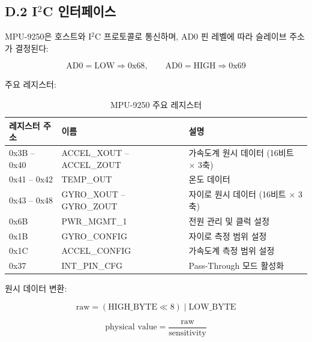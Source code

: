 \subsection*{D.2 I$^2$C 인터페이스}
 
MPU-9250은 호스트와 I$^2$C 프로토콜로 통신하며,
AD0 핀 레벨에 따라 슬레이브 주소가 결정된다:
 
\begin{equation}
    \text{AD0} = \text{LOW} \Rightarrow 0\text{x}68, \qquad
    \text{AD0} = \text{HIGH} \Rightarrow 0\text{x}69
    \tag{D.1}
\end{equation}
 
주요 레지스터:
 
\begin{table}[H]
    \centering
    \caption{MPU-9250 주요 레지스터}
    \label{tab:mpu9250_reg}
    \begin{tabular}{lll}
        \toprule
        레지스터 주소 & 이름 & 설명 \\
        \midrule
        0x3B -- 0x40 & ACCEL\_XOUT -- ACCEL\_ZOUT & 가속도계 원시 데이터 (16비트 $\times$ 3축) \\
        0x41 -- 0x42 & TEMP\_OUT & 온도 데이터 \\
        0x43 -- 0x48 & GYRO\_XOUT -- GYRO\_ZOUT & 자이로 원시 데이터 (16비트 $\times$ 3축) \\
        0x6B & PWR\_MGMT\_1 & 전원 관리 및 클럭 설정 \\
        0x1B & GYRO\_CONFIG & 자이로 측정 범위 설정 \\
        0x1C & ACCEL\_CONFIG & 가속도계 측정 범위 설정 \\
        0x37 & INT\_PIN\_CFG & Pass-Through 모드 활성화 \\
        \bottomrule
    \end{tabular}
\end{table}
 
원시 데이터 변환:
 
\begin{equation}
    \text{raw} = (\text{HIGH\_BYTE} \ll 8) \mid \text{LOW\_BYTE}
    \tag{D.2}
\end{equation}
 
\begin{equation}
    \text{physical value} = \frac{\text{raw}}{\text{sensitivity}}
    \tag{D.3}
\end{equation}
 
